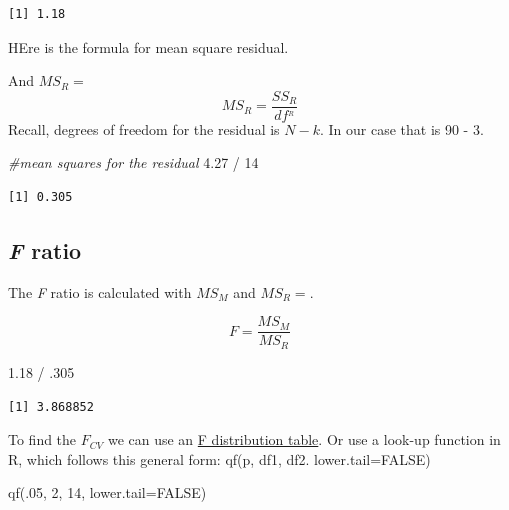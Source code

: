 \documentclass[
  11pt,
]{book}
\newenvironment{Shaded}{\begin{snugshade}}{\end{snugshade}}
\newcommand{\AttributeTok}[1]{\textcolor[rgb]{0.77,0.63,0.00}{#1}}
\newcommand{\CommentTok}[1]{\textcolor[rgb]{0.56,0.35,0.01}{\textit{#1}}}
\newcommand{\ConstantTok}[1]{\textcolor[rgb]{0.00,0.00,0.00}{#1}}
\newcommand{\DecValTok}[1]{\textcolor[rgb]{0.00,0.00,0.81}{#1}}
\newcommand{\FloatTok}[1]{\textcolor[rgb]{0.00,0.00,0.81}{#1}}
\newcommand{\FunctionTok}[1]{\textcolor[rgb]{0.00,0.00,0.00}{#1}}
\newcommand{\NormalTok}[1]{#1}
\newcommand{\SpecialCharTok}[1]{\textcolor[rgb]{0.00,0.00,0.00}{#1}}
\begin{document}
\begin{verbatim}
[1] 1.18
\end{verbatim}

HEre is the formula for mean square residual.

And \(MS_R=\)
\[MS_R = \frac{SS_{R}}{df^{_{R}}}\]
Recall, degrees of freedom for the residual is \(N - k\). In our case that is 90 - 3.

\begin{Shaded}
\begin{Highlighting}[]
\CommentTok{\#mean squares for the residual}
\FloatTok{4.27} \SpecialCharTok{/} \DecValTok{14}
\end{Highlighting}
\end{Shaded}

\begin{verbatim}
[1] 0.305
\end{verbatim}

\hypertarget{f-ratio}{%
\subsection{\texorpdfstring{\emph{F} ratio}{F ratio}}\label{f-ratio}}

The \emph{F} ratio is calculated with \(MS_M\) and \(MS_R=\).

\[F = \frac{MS_{M}}{MS_{R}}\]

\begin{Shaded}
\begin{Highlighting}[]
\FloatTok{1.18} \SpecialCharTok{/}\NormalTok{ .}\DecValTok{305}
\end{Highlighting}
\end{Shaded}

\begin{verbatim}
[1] 3.868852
\end{verbatim}

To find the \(F_{CV}\) we can use an \href{https://www.statology.org/f-distribution-table/}{F distribution table}. Or use a look-up function in R, which follows this general form: qf(p, df1, df2. lower.tail=FALSE)

\begin{Shaded}
\begin{Highlighting}[]
\FunctionTok{qf}\NormalTok{(.}\DecValTok{05}\NormalTok{, }\DecValTok{2}\NormalTok{, }\DecValTok{14}\NormalTok{, }\AttributeTok{lower.tail=}\ConstantTok{FALSE}\NormalTok{)}
\end{Highlighting}
\end{Shaded}
\end{document}
